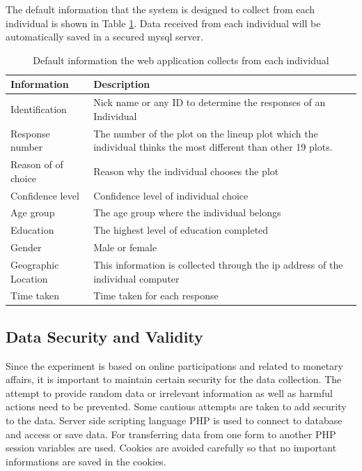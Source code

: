 \documentclass[11pt]{article}
\begin{document}
The default information that the system is designed to collect from each individual is shown in Table \ref{tbl:data_info}. Data received from each individual will be automatically saved in a secured mysql server. 

\begin{table}[hbtp]
\caption{Default information the web application collects from each individual}
\centering 
\begin{tabular}{lp{8cm}} 
\hline
Information &  Description \\ %
\hline
Identification & Nick name or any ID to determine the responses of an Individual \\
Response number & The number of the plot on the lineup plot which the individual thinks the most different than other 19 plots.\\ 
Reason of of choice & Reason why the individual chooses the plot \\
Confidence level & Confidence level of individual choice \\ 
Age group& The age group where the individual belongs \\
Education & The highest level of education completed \\
Gender & Male or female \\
Geographic Location & This information is collected through the ip address of the individual computer \\ 
Time taken & Time taken for each response\\
\hline
\end{tabular}
\label{tbl:data_info}
\end{table}	




\subsection{Data Security and Validity} 

Since the experiment is based on online participations and related to monetary affairs, it is important to maintain certain security for the data collection. The attempt to provide random data or irrelevant information as well as harmful actions need to be prevented.  Some cautious attempts are taken to add security to the data. Server side scripting language PHP is used to connect to database and access or save data. For transferring data from one form to another PHP session variables are used. Cookies are avoided carefully so that no important informations are saved in the cookies. 
\end{document}
